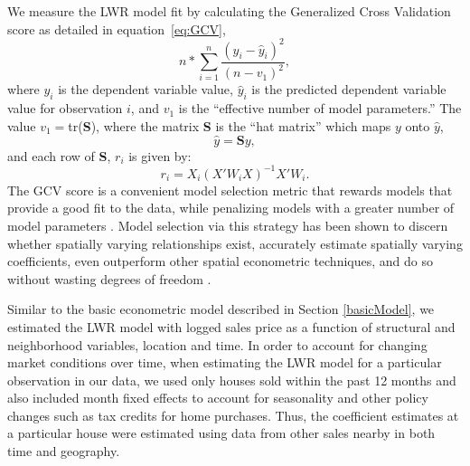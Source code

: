 \documentclass[leqno]{article}\usepackage[]{graphicx}\usepackage[]{color}
\begin{document}
We measure the LWR model fit by calculating the Generalized Cross Validation score as detailed in equation~\eqref{eq:GCV},
\begin{equation}\label{eq:GCV}
n*\sum_{i=1}^{n}\frac{(y_i-\hat{y}_i)^2}{(n-v_1)^2}, 
\end{equation} 
where $y_i$ is the dependent variable value, $\hat{y}_i$ is the predicted dependent variable value for observation $i$, and $v_1$ is the ``effective number of model parameters.'' The value  
$v_1=$tr(\textbf{S}), where the matrix \textbf{S} is the ``hat matrix'' which maps $y$ onto $\hat{y}$,
                   \begin{equation*}
                   \hat{y}=\textbf{S}y,
                   \end{equation*}
                   and each row of \textbf{S}, $r_i$ is given by:
                     \begin{equation*}
                   r_i=X_i(X'W_iX)^{-1}X'W_i.
                   \end{equation*}
The GCV score is a convenient model selection metric that rewards models that provide a good fit to the data, while penalizing models with a greater number of model parameters \citep{Loader1999, McMillen2010}. Model selection via this strategy has been shown to discern whether spatially varying relationships exist, accurately estimate spatially varying coefficients, even outperform other spatial econometric techniques, and do so without wasting degrees of freedom \citep{Paez2011, McMillen2010, McMillen2012}. 

Similar to the basic econometric model described in Section \ref{basicModel}, we estimated the LWR model with logged sales price as a function of structural and neighborhood variables, location and time. In order to account for changing market conditions over time, when estimating the LWR model for a particular observation in our data, we used only houses sold within the past 12 months and also included month fixed effects to account for seasonality and other policy changes such as tax credits for home purchases. Thus, the coefficient estimates at a particular house were estimated using data from other sales nearby in both time and geography.
\end{document}
